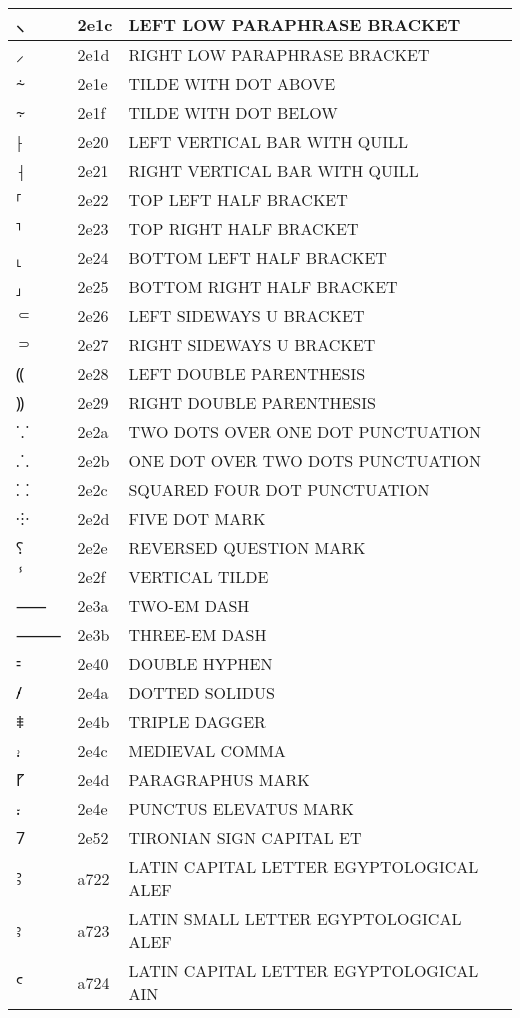 \documentclass[12pt,letterpaper,openany]{book}
\begin{document}
\begin{center}
\begin{supertabular}{|m{0.25in}|m{0.5in}|m{4in}|}
⸜ & 2e1c & LEFT LOW PARAPHRASE BRACKET\\\hline
⸝ & 2e1d & RIGHT LOW PARAPHRASE BRACKET\\\hline
⸞ & 2e1e & TILDE WITH DOT ABOVE\\\hline
⸟ & 2e1f & TILDE WITH DOT BELOW\\\hline
⸠ & 2e20 & LEFT VERTICAL BAR WITH QUILL\\\hline
⸡ & 2e21 & RIGHT VERTICAL BAR WITH QUILL\\\hline
⸢ & 2e22 & TOP LEFT HALF BRACKET\\\hline
⸣ & 2e23 & TOP RIGHT HALF BRACKET\\\hline
⸤ & 2e24 & BOTTOM LEFT HALF BRACKET\\\hline
⸥ & 2e25 & BOTTOM RIGHT HALF BRACKET\\\hline
⸦ & 2e26 & LEFT SIDEWAYS U BRACKET\\\hline
⸧ & 2e27 & RIGHT SIDEWAYS U BRACKET\\\hline
⸨ & 2e28 & LEFT DOUBLE PARENTHESIS\\\hline
⸩ & 2e29 & RIGHT DOUBLE PARENTHESIS\\\hline
⸪ & 2e2a & TWO DOTS OVER ONE DOT PUNCTUATION\\\hline
⸫ & 2e2b & ONE DOT OVER TWO DOTS PUNCTUATION\\\hline
⸬ & 2e2c & SQUARED FOUR DOT PUNCTUATION\\\hline
⸭ & 2e2d & FIVE DOT MARK\\\hline
⸮ & 2e2e & REVERSED QUESTION MARK\\\hline
ⸯ & 2e2f & VERTICAL TILDE\\\hline
⸺ & 2e3a & TWO-EM DASH\\\hline
⸻ & 2e3b & THREE-EM DASH\\\hline
⹀ & 2e40 & DOUBLE HYPHEN\\\hline
⹊ & 2e4a & DOTTED SOLIDUS\\\hline
⹋ & 2e4b & TRIPLE DAGGER\\\hline
⹌ & 2e4c & MEDIEVAL COMMA\\\hline
⹍ & 2e4d & PARAGRAPHUS MARK\\\hline
⹎ & 2e4e & PUNCTUS ELEVATUS MARK\\\hline
⹒ & 2e52 & TIRONIAN SIGN CAPITAL ET\\\hline
Ꜣ & a722 & LATIN CAPITAL LETTER EGYPTOLOGICAL ALEF\\\hline
ꜣ & a723 & LATIN SMALL LETTER EGYPTOLOGICAL ALEF\\\hline
Ꜥ & a724 & LATIN CAPITAL LETTER EGYPTOLOGICAL AIN\\\hline

\end{supertabular}
\end{center}
\end{document}
